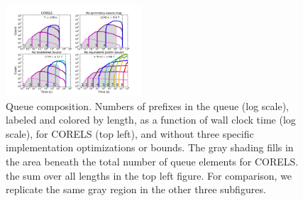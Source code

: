 \begin{figure}[t!]
\begin{center}
\includegraphics[trim={30mm 15mm 35mm 30mm},
width=0.45\textwidth]{figs/kdd_compas_ablation_small-queue.pdf}
\end{center}
\caption{Queue composition.
%
Numbers of prefixes in the queue (log scale), labeled and colored by length,
as a function of wall clock time (log scale), for CORELS (top left),
and without three specific implementation optimizations or bounds.
%
The gray shading fills in the area beneath the total number of
queue elements for CORELS.
\ie the sum over all lengths in the top left figure.
%
For comparison, we replicate the same gray region
in the other three subfigures.
}
\label{fig:queue}
\end{figure}

